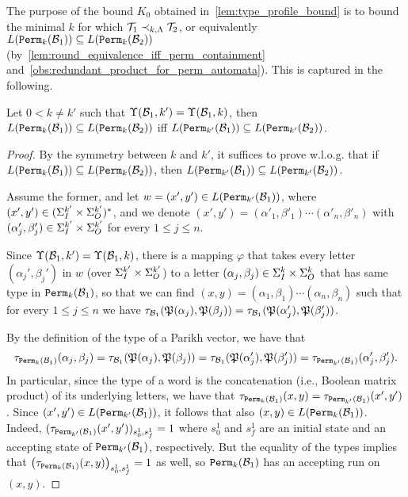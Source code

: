 The purpose of the bound $K_0$ obtained in~\autoref{lem:type_profile_bound} is to bound the minimal $k$ for which $\mathcal{T}_1\prec_{k,\Lambda} \mathcal{T}_2$, or equivalently $L({\mathtt{Perm}}_{k}(\mathcal{B}_1))\subseteq L({\mathtt{Perm}}_{k}(\mathcal{B}_2))$ (by~\autoref{lem:round_equivalence_iff_perm_containment} and~\autoref{obs:redundant_product_for_perm_automata}).
This is captured in the following.

\begin{lemma}
	\label{lem:profile_equality_to_simulation}
	Let $0<k\neq k'$ such that $\Upsilon(\mathcal{B}_1,k')=\Upsilon(\mathcal{B}_1,k)$, then
	$L({\mathtt{Perm}}_{k}(\mathcal{B}_1))\subseteq L({\mathtt{Perm}}_{k}(\mathcal{B}_2))$ iff $L({\mathtt{Perm}}_{k'}(\mathcal{B}_1))\subseteq L({\mathtt{Perm}}_{k'}(\mathcal{B}_2))$.
\end{lemma}
\begin{proof}

By the symmetry between $k$ and $k'$, it suffices to prove w.l.o.g. that if $L({\mathtt{Perm}}_{k}(\mathcal{B}_1))\subseteq L({\mathtt{Perm}}_{k}(\mathcal{B}_2))$, then $L({\mathtt{Perm}}_{k'}(\mathcal{B}_1))\subseteq L({\mathtt{Perm}}_{k'}(\mathcal{B}_2))$.

Assume the former, and let $w=(x',y')\in L({\mathtt{Perm}}_{k'}(\mathcal{B}_1))$, where $(x',y')\in (\Sigma_{I}^{k'}\times \Sigma_{O}^{k'})^*$, and we denote $(x',y')=(\alpha'_1,\beta'_1)\cdots (\alpha'_n,\beta'_n)$ with $(\alpha'_j,\beta'_j)\in \Sigma_{I}^{k'}\times \Sigma_{O}^{k'}$ for every $1\le j\le n$. 

Since $\Upsilon(\mathcal{B}_1,k')=\Upsilon(\mathcal{B}_1,k)$, there is a mapping $\varphi$ that takes every letter $(\alpha_j',\beta_j')$ in $w$ (over $\Sigma_{I}^{k'}\times \Sigma_{O}^{k'}$) to a letter $(\alpha_j,\beta_j)\in\Sigma_{I}^{k}\times \Sigma_{O}^{k}$ that has same type in ${\mathtt{Perm}}_{k}(\mathcal{B}_1)$, so that we can find $(x,y)=(\alpha_1,\beta_1)\cdots (\alpha_n,\beta_n)$ such that for every $1\le j\le n$ we have $\tau_{\mathcal{B}_1}(\mathfrak{P}(\alpha_j),\mathfrak{P}(\beta_j))=\tau_{\mathcal{B}_1}(\mathfrak{P}(\alpha'_j),\mathfrak{P}(\beta'_j))$. 

By the definition of the type of a Parikh vector, we have that \[\tau_{{\mathtt{Perm}}_k(\mathcal{B}_1)}(\alpha_j,\beta_j)=\tau_{\mathcal{B}_1}(\mathfrak{P}(\alpha_j),\mathfrak{P}(\beta_j))=\tau_{\mathcal{B}_1}(\mathfrak{P}(\alpha'_j),\mathfrak{P}(\beta'_j))=\tau_{{\mathtt{Perm}}_{k'}(\mathcal{B}_1)}(\alpha'_j,\beta'_j).\]
In particular, since the type of a word is the concatenation (i.e., Boolean matrix product) of its underlying letters, we have that $\tau_{{\mathtt{Perm}}_k(\mathcal{B}_1)}(x,y)=\tau_{{\mathtt{Perm}}_{k'}(\mathcal{B}_1)}(x',y')$. Since $(x',y')\in L({\mathtt{Perm}}_{k'}(\mathcal{B}_1))$, it follows that also $(x,y)\in L({\mathtt{Perm}}_{k}(\mathcal{B}_1))$. Indeed, 
$(\tau_{{\mathtt{Perm}}_{k'}(\mathcal{B}_1)}(x',y'))_{s^1_0,s^1_f}=1$ where $s^1_0$ and $s^1_f$ are an initial state and an accepting state of ${\mathtt{Perm}}_{k'}(\mathcal{B}_1)$, respectively. But the equality of the types implies that $\left(\tau_{{\mathtt{Perm}}_{k}(\mathcal{B}_1)}(x,y)\right)_{s^1_0,s^1_f}=1$ as well, so ${\mathtt{Perm}}_k(\mathcal{B}_1)$ has an accepting run on $(x,y)$.


\end{proof}
